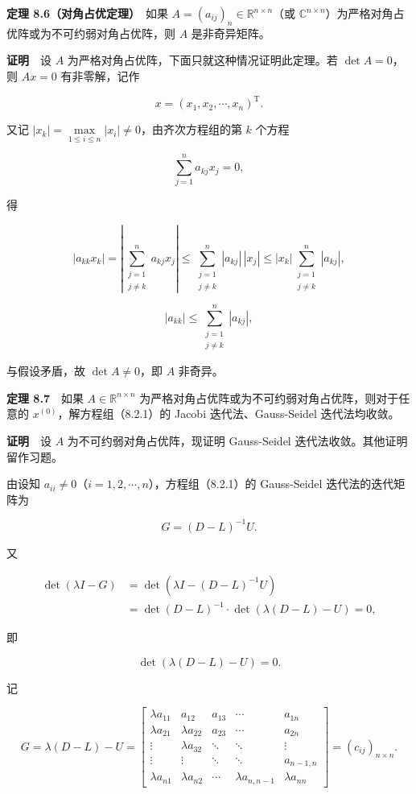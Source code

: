 \textbf{定理 8.6（对角占优定理）}　如果 \(A=(a_{ij})_n\in\mathbb R^{n\times n}\)（或 \(\mathbb C^{n\times n}\)）为严格对角占优阵或为不可约弱对角占优阵，则 \(A\) 是非奇异矩阵。

\textbf{证明}　设 \(A\) 为严格对角占优阵，下面只就这种情况证明此定理。若 \(\det A=0\)，则 \(Ax=0\) 有非零解，记作

\[
x=(x_1,x_2,\cdots,x_n)^{\mathrm T}.
\]

又记 \(|x_k|=\max\limits_{1\leqslant i\leqslant n}|x_i|\neq0\)，由齐次方程组的第 \(k\) 个方程

\[
\sum_{j=1}^n a_{kj}x_j=0,
\]

得

\[
|a_{kk}x_k|=\left|\sum_{\substack{j=1\\j\neq k}}^n a_{kj}x_j\right|
\leqslant\sum_{\substack{j=1\\j\neq k}}^n|a_{kj}|\,|x_j|
\leqslant|x_k|\sum_{\substack{j=1\\j\neq k}}^n|a_{kj}|,
\]

\[
|a_{kk}|\leqslant\sum_{\substack{j=1\\j\neq k}}^n|a_{kj}|,
\tag{8.3.9}
\]

与假设矛盾，故 \(\det A\neq0\)，即 \(A\) 非奇异。

\textbf{定理 8.7}　如果 \(A\in\mathbb R^{n\times n}\) 为严格对角占优阵或为不可约弱对角占优阵，则对于任意的 \(x^{(0)}\)，解方程组（8.2.1）的 Jacobi 迭代法、Gauss-Seidel 迭代法均收敛。

\textbf{证明}　设 \(A\) 为不可约弱对角占优阵，现证明 Gauss-Seidel 迭代法收敛。其他证明留作习题。

由设知 \(a_{ii}\neq0\)（\(i=1,2,\cdots,n\)），方程组（8.2.1）的 Gauss-Seidel 迭代法的迭代矩阵为

\[
G=(D-L)^{-1}U.
\]

又

\[
\begin{aligned}
\det(\lambda I-G)&=\det(\lambda I-(D-L)^{-1}U)\\
&=\det(D-L)^{-1}\cdot\det(\lambda(D-L)-U)=0,
\end{aligned}
\]

即

\[
\det(\lambda(D-L)-U)=0.
\]

记

\[
G=\lambda(D-L)-U=\begin{bmatrix}
\lambda a_{11}&a_{12}&a_{13}&\cdots&a_{1n}\\
\lambda a_{21}&\lambda a_{22}&a_{23}&\cdots&a_{2n}\\
\vdots&\lambda a_{32}&\ddots&\ddots&\vdots\\
\vdots&\vdots&\ddots&\ddots&a_{n-1,n}\\
\lambda a_{n1}&\lambda a_{n2}&\cdots&\lambda a_{n,n-1}&\lambda a_{nn}
\end{bmatrix}=(c_{ij})_{n\times n}.
\]

